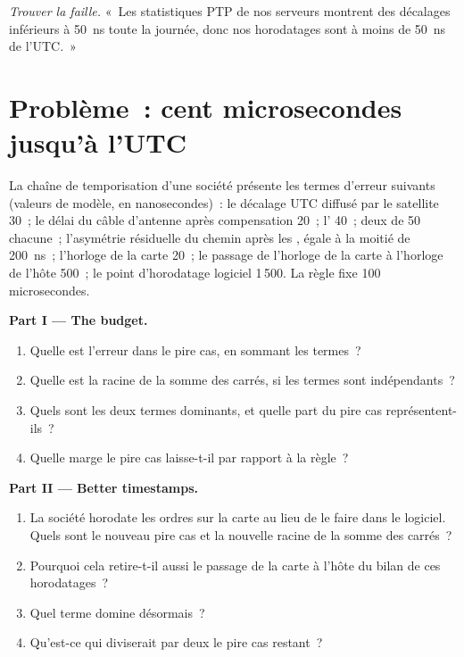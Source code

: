 \begin{exercise}[$\star\star\star$]\label{exo:nw:time-synchronisation:8}
\emph{Trouver la faille.} «~Les statistiques PTP de nos serveurs montrent des décalages inférieurs à 50~ns toute la journée, donc nos horodatages sont à moins de 50~ns de l'UTC.~»
\end{exercise}

\section{Problème~: cent microsecondes jusqu'à l'UTC}

\begin{problem}\label{pb:nw:time-synchronisation:1}
La chaîne de temporisation d'une société présente les termes d'erreur suivants (valeurs de modèle, en nanosecondes)~: le décalage UTC diffusé par le satellite 30~; le délai du câble d'antenne
après compensation 20~; l' 40~; deux  de 50 chacune~; l'asymétrie résiduelle du chemin après les ,
égale à la moitié de \qty{200}{\nano\second}~; l'horloge de la carte 20~; le passage de l'horloge de la carte à l'horloge de l'hôte 500~; le point d'horodatage
logiciel 1\,500. La règle fixe 100 microsecondes.

\medskip\noindent\textbf{Part I --- The budget.}
\begin{enumerate}
\item Quelle est l'erreur dans le pire cas, en sommant les termes~?
\item Quelle est la racine de la somme des carrés, si les termes sont indépendants~?
\item Quels sont les deux termes dominants, et quelle part du pire cas représentent-ils~?
\item Quelle marge le pire cas laisse-t-il par rapport à la règle~?
\end{enumerate}

\medskip\noindent\textbf{Part II --- Better timestamps.}
\begin{enumerate}[resume]
\item La société horodate les ordres sur la carte au lieu de le faire dans le logiciel. Quels sont le nouveau pire cas et la nouvelle racine de la somme des carrés~?
\item Pourquoi cela retire-t-il aussi le passage de la carte à l'hôte du bilan de ces horodatages~?
\item Quel terme domine désormais~?
\item Qu'est-ce qui diviserait par deux le pire cas restant~?
\end{enumerate}


\end{problem}
